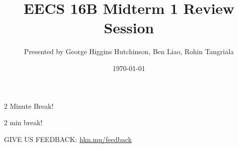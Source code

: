

\title{EECS 16B Midterm 1 Review Session}
\author{Presented by George Higgins Hutchinson, Ben Liao, Rohin Tangriala}
\date{\today}

\newcommand{\SlideAccessingLogistics}{\@691}










\begin{frame}
    2 Minute Break!
\end{frame}



	\begin{frame}
	    2 min break!

        GIVE US FEEDBACK: \url{hkn.mu/feedback}
	\end{frame}







